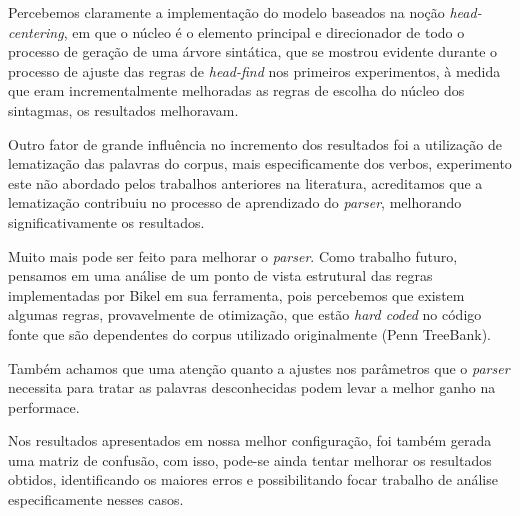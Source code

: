 Percebemos claramente a implementação do modelo baseados na noção \emph{head-centering}, em que o núcleo é o elemento principal e direcionador de todo o processo de geração de uma árvore sintática, que se mostrou evidente durante o processo de ajuste das regras de \emph{head-find} nos primeiros experimentos, à medida que eram incrementalmente melhoradas as regras de escolha do núcleo dos sintagmas, os resultados melhoravam.

Outro fator de grande influência no incremento dos resultados foi a utilização de lematização das palavras do corpus, mais especificamente dos verbos, experimento este não abordado pelos trabalhos anteriores na literatura, acreditamos que a lematização contribuiu no processo de aprendizado do \emph{parser}, melhorando significativamente os resultados.

Muito mais pode ser feito para melhorar o \emph{parser}. Como trabalho futuro, pensamos em uma análise de um ponto de vista estrutural das regras implementadas por Bikel em sua ferramenta, pois percebemos que existem algumas regras, provavelmente de otimização, que estão \emph{hard coded} no código fonte que são dependentes do corpus utilizado originalmente (Penn TreeBank). 

Também achamos que uma atenção quanto a ajustes nos parâmetros que o \emph{parser} necessita para tratar as palavras desconhecidas podem levar a melhor ganho na performace.

Nos resultados apresentados em nossa melhor configuração, foi também gerada uma matriz de confusão, com isso, pode-se ainda tentar melhorar os resultados obtidos, identificando os maiores erros e possibilitando focar trabalho de análise especificamente nesses casos. 

